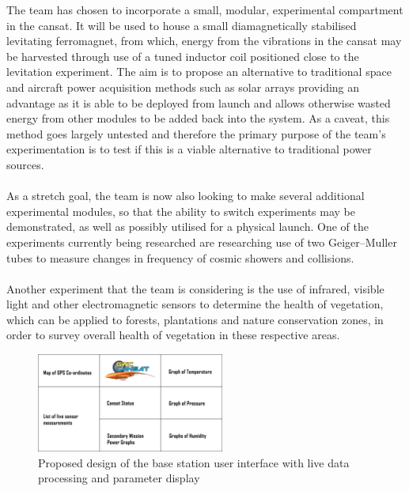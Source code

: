 \documentclass{report}
\begin{document}
		The team has chosen to incorporate a small, modular, experimental
		compartment in the cansat. It will be used to house a small diamagnetically
		stabilised levitating ferromagnet, from which, energy from the vibrations in 
		the cansat may be harvested through use of a tuned inductor coil positioned
		close to the levitation experiment. The aim is to propose an alternative to
		traditional space and aircraft power acquisition methods such as solar arrays
		providing an advantage as it is able to be deployed from launch and allows
		otherwise wasted energy from other modules to be added back into the
		system. As a caveat, this method goes largely untested and therefore the
		primary purpose of the team’s experimentation is to test if this is a viable
		alternative to traditional power sources.\\\\
\noindent
		{\color{blue}
		As a stretch goal, the team is now also looking to make several additional
		experimental modules, so that the ability to switch experiments may be 
		demonstrated, as well as possibly utilised for a physical launch. One of the 
		experiments currently being researched are researching use of two 
		Geiger--Muller tubes to measure changes in frequency of cosmic showers 
		and collisions.
		\\\\
		Another experiment that the team is considering is the use of infrared,
		visible light and other electromagnetic sensors to determine the health of
		vegetation, which can be applied to forests, plantations and nature conservation
		zones, in order to survey overall health of vegetation in these respective
		areas.
		\\
		}

		
		\begin{figure}[H]
			\begin{center}
				\includegraphics[width=0.55\textwidth]{gui}
			\end{center}
			\vspace{-10pt}
			\caption{Proposed design of the base station user interface with live 
			 data processing and parameter display}
		\end{figure}
\end{document}
